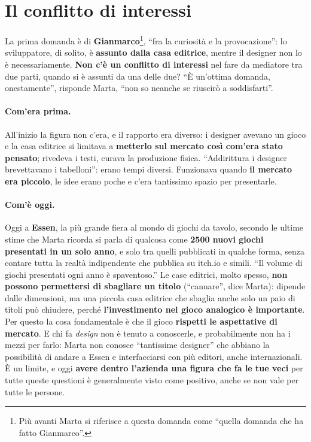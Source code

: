\section{Il conflitto di interessi}
\label{a13:sec:conflitto}

La prima domanda è di \textbf{Gianmarco}\footnote{Più avanti Marta si riferisce a questa
domanda come ``quella domanda che ha fatto Gianmarco''.}, ``fra la curiosità e la
provocazione'': lo sviluppatore, di solito, è \textbf{assunto dalla casa editrice}, mentre
il designer non lo è necessariamente. \textbf{Non c'è un conflitto di interessi} nel fare
da mediatore tra due parti, quando si è assunti da una delle due? ``È un'ottima domanda,
onestamente'', risponde Marta, ``non so neanche se riuscirò a soddisfarti''.

\paragraph{Com'era prima.} All'inizio la figura non c'era, e il rapporto era diverso: i
designer avevano un gioco e la casa editrice si limitava a \textbf{metterlo sul mercato
così com'era stato pensato}; rivedeva i testi, curava la produzione fisica. ``Addirittura
i designer brevettavano i tabelloni'': erano tempi diversi. Funzionava quando \textbf{il
mercato era piccolo}, le idee erano poche e c'era tantissimo spazio per presentarle.

\paragraph{Com'è oggi.} Oggi a \textbf{Essen}, la più grande fiera al mondo di giochi da
tavolo, secondo le ultime stime che Marta ricorda si parla di qualcosa come \textbf{2500
nuovi giochi presentati in un solo anno}, e solo tra quelli pubblicati in qualche forma,
senza contare tutta la realtà indipendente che pubblica su itch.io e simili. ``Il volume
di giochi presentati ogni anno è spaventoso.'' Le case editrici, molto spesso,
\textbf{non possono permettersi di sbagliare un titolo} (``cannare'', dice Marta): dipende
dalle dimensioni, ma una piccola casa editrice che sbaglia anche solo un paio di titoli
può chiudere, perché \textbf{l'investimento nel gioco analogico è importante}. Per questo la
cosa fondamentale è che il gioco \textbf{rispetti le aspettative di mercato}. E chi fa
\emph{design} non è tenuto a conoscerle, e probabilmente non ha i mezzi per farlo: Marta
non conosce ``tantissime designer'' che abbiano la possibilità di andare a Essen e
interfacciarsi con più editori, anche internazionali. È un limite, e oggi \textbf{avere
dentro l'azienda una figura che fa le tue veci} per tutte queste questioni è generalmente
visto come positivo, anche se non vale per tutte le persone.

